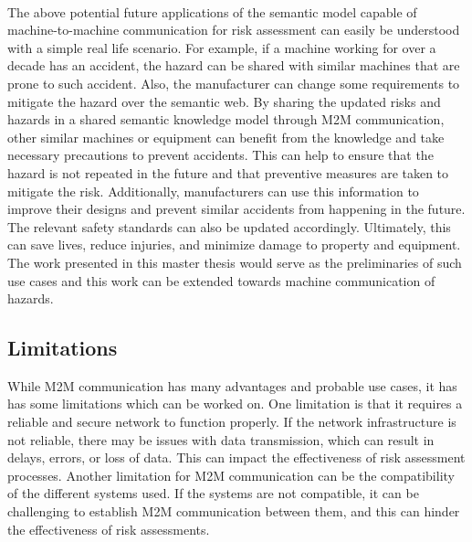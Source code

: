 \paragraph{} The above potential future applications of the semantic model capable of machine-to-machine communication for risk assessment can easily be understood with a simple real life scenario. For example, if a machine working for over a decade has an accident, the hazard can be shared with similar machines that are prone to such accident. Also, the manufacturer can change some requirements to mitigate the hazard over the semantic web. By sharing the updated risks and hazards in a shared semantic knowledge model through M2M communication, other similar machines or equipment can benefit from the knowledge and take necessary precautions to prevent accidents. This can help to ensure that the hazard is not repeated in the future and that preventive measures are taken to mitigate the risk. Additionally, manufacturers can use this information to improve their designs and prevent similar accidents from happening in the future. The relevant safety standards can also be updated accordingly. Ultimately, this can save lives, reduce injuries, and minimize damage to property and equipment. The work presented in this master thesis would serve as the preliminaries of such use cases and this work can be extended towards machine communication of hazards.

\subsection{Limitations}
While M2M communication has many advantages and probable use cases, it has has some limitations which can be worked on. One limitation is that it requires a reliable and secure network to function properly. If the network infrastructure is not reliable, there may be issues with data transmission, which can result in delays, errors, or loss of data. This can impact the effectiveness of risk assessment processes. Another limitation for M2M communication can be the compatibility of the different systems used. If the systems are not compatible, it can be challenging to establish M2M communication between them, and this can hinder the effectiveness of risk assessments.

